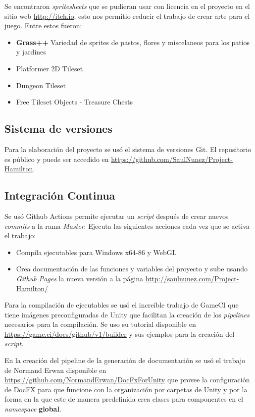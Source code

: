 Se encontraron \textit{spritesheets} que se pudieran usar con licencia en el proyecto en el sitio web \url{http://itch.io}, esto nos permitio reducir el trabajo de crear arte para el juego.
Entre estos fueron:
\begin{itemize}
    \item \textbf{Grass++} Variedad de sprites de pastos, flores y miscelaneos para los patios y jardines
    \item Platformer 2D Tileset
    \item Dungeon Tileset
    \item Free Tileset Objects - Treasure Chests
\end{itemize}

\subsection{Sistema de versiones}
Para la elaboración del proyecto se usó el sistema de versiones Git. El repositorio es público y puede ser accedido en \url{https://github.com/SaulNunez/Project-Hamilton}.

\subsection{Integración Continua}
Se usó Github Actions permite ejecutar un \textit{script} después de crear nuevos \textit{commits} a la rama \textit{Master}.
Ejecuta las siguientes acciones cada vez que se activa el trabajo:
\begin{itemize}
    \item Compila ejecutables para Windows x64-86 y WebGL
    \item Crea documentación de las funciones y variables del proyecto y sube usando \textit{Github Pages} la nueva versión a la página \url{http://saulnunez.com/Project-Hamilton/}
\end{itemize}

Para la compilación de ejecutables se usó el increíble trabajo de GameCI que tiene imágenes preconfiguradas de Unity que facilitan la creación de los \textit{pipelines} necesarios para la compilación. Se uso su tutorial disponible en \url{https://game.ci/docs/github/v1/builder} y sus ejemplos para la creación del \textit{script}.

En la creación del pipeline de la generación de documentación se usó el trabajo de Normand Erwan disponible en \url{https://github.com/NormandErwan/DocFxForUnity} que provee la configuración de DocFX para que funcione con la organización por carpetas de Unity y por la forma en la que este de manera predefinida crea clases para componentes en el \textit{namespace} \textbf{global}.

